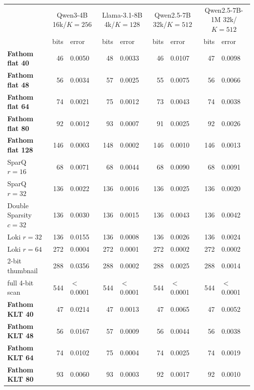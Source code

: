 \begin{tabular}{lrlrlrlrl}
\toprule
 & \multicolumn{2}{c}{Qwen3-4B 16k/$K{=}256$} & \multicolumn{2}{c}{Llama-3.1-8B 4k/$K{=}128$} & \multicolumn{2}{c}{Qwen2.5-7B 32k/$K{=}512$} & \multicolumn{2}{c}{Qwen2.5-7B-1M 32k/$K{=}512$} \\
 & bits & error & bits & error & bits & error & bits & error \\
\midrule
\textbf{Fathom flat 40} & 46 & 0.0050 & 48 & 0.0033 & 46 & 0.0107 & 47 & 0.0098 \\
\textbf{Fathom flat 48} & 56 & 0.0034 & 57 & 0.0025 & 55 & 0.0075 & 56 & 0.0066 \\
\textbf{Fathom flat 64} & 74 & 0.0021 & 75 & 0.0012 & 73 & 0.0043 & 74 & 0.0038 \\
\textbf{Fathom flat 80} & 92 & 0.0012 & 93 & 0.0007 & 91 & 0.0025 & 92 & 0.0026 \\
\textbf{Fathom flat 128} & 146 & 0.0003 & 148 & 0.0002 & 146 & 0.0010 & 146 & 0.0013 \\
SparQ $r{=}16$ & 68 & 0.0071 & 68 & 0.0044 & 68 & 0.0090 & 68 & 0.0091 \\
SparQ $r{=}32$ & 136 & 0.0022 & 136 & 0.0016 & 136 & 0.0025 & 136 & 0.0020 \\
Double Sparsity $c{=}32$ & 136 & 0.0030 & 136 & 0.0015 & 136 & 0.0043 & 136 & 0.0042 \\
Loki $r{=}32$ & 136 & 0.0155 & 136 & 0.0008 & 136 & 0.0026 & 136 & 0.0024 \\
Loki $r{=}64$ & 272 & 0.0004 & 272 & 0.0001 & 272 & 0.0002 & 272 & 0.0002 \\
2-bit thumbnail & 288 & 0.0356 & 288 & 0.0002 & 288 & 0.0025 & 288 & 0.0014 \\
full 4-bit scan & 544 & $<$0.0001 & 544 & $<$0.0001 & 544 & $<$0.0001 & 544 & $<$0.0001 \\
\textbf{Fathom KLT 40} & 47 & 0.0214 & 47 & 0.0013 & 47 & 0.0065 & 47 & 0.0052 \\
\textbf{Fathom KLT 48} & 56 & 0.0167 & 57 & 0.0009 & 56 & 0.0044 & 56 & 0.0038 \\
\textbf{Fathom KLT 64} & 74 & 0.0102 & 75 & 0.0004 & 74 & 0.0025 & 74 & 0.0019 \\
\textbf{Fathom KLT 80} & 93 & 0.0060 & 93 & 0.0003 & 92 & 0.0017 & 92 & 0.0010 \\
\bottomrule
\end{tabular}